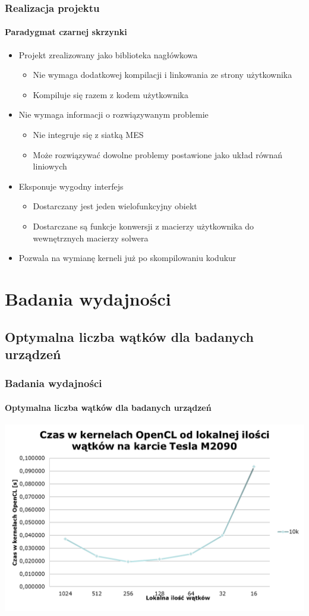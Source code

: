 \documentclass{beamer}
\begin{document}
\begin{frame}
\frametitle{Realizacja projektu}
\framesubtitle{Paradygmat czarnej skrzynki}

\begin{itemize}[<+->]
	\item Projekt zrealizowany jako biblioteka nagłówkowa
	\begin{itemize}
		\item Nie wymaga dodatkowej kompilacji i linkowania ze strony użytkownika
		\item Kompiluje się razem z kodem użytkownika
	\end{itemize}
	\item Nie wymaga informacji o rozwiązywanym problemie
	\begin{itemize}
		\item Nie integruje się z siatką MES
		\item Może rozwiązywać dowolne problemy postawione jako układ równań liniowych
	\end{itemize}
	\item Eksponuje wygodny interfejs
		\begin{itemize}
		\item Dostarczany jest jeden wielofunkcyjny obiekt
		\item Dostarczane są funkcje konwersji z macierzy użytkownika do wewnętrznych macierzy solwera
		\end{itemize}
	\item Pozwala na wymianę kerneli już po skompilowaniu kodukur
\end{itemize}

\end{frame}

\section{Badania wydajności}

\subsection{Optymalna liczba wątków dla badanych urządzeń}

\begin{frame}
\frametitle{Badania wydajności}
\framesubtitle{Optymalna liczba wątków dla badanych urządzeń}
\hfill\includegraphics[scale=0.45]{czas1.png}\hspace*{\fill}
\end{frame}
\end{document}
